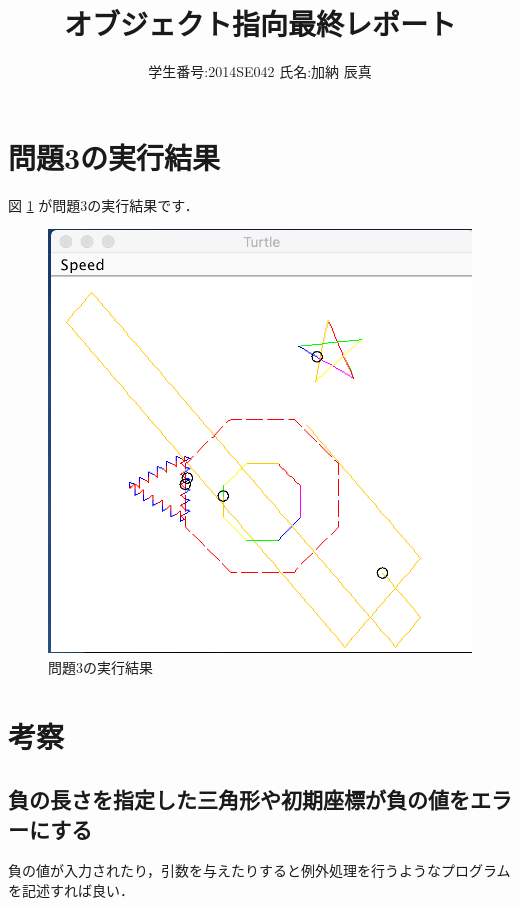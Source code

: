 \documentclass{jarticle}
\title{オブジェクト指向最終レポート}
\author{学生番号:2014SE042 氏名:加納 辰真}
\begin{document}
\maketitle

\newpage

\section{問題3の実行結果}
図 \ref{emb} が問題3の実行結果です．

\begin{figure}[ht]
  \begin{center}
    \includegraphics{ex3.png}
    \caption{問題3の実行結果}
    \label{emb}
  \end{center}
\end{figure}

\section{考察}
\subsection{負の長さを指定した三角形や初期座標が負の値をエラーにする}
負の値が入力されたり，引数を与えたりすると例外処理を行うようなプログラムを記述すれば良い．
\end{document}

